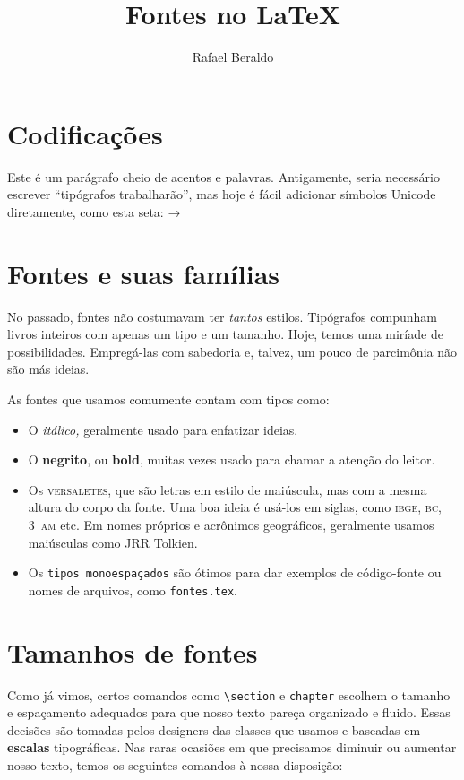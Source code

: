 \documentclass[11pt,a4paper,oneside]{article}
\title{Fontes no \LaTeX}
\author{Rafael Beraldo}
\begin{document}
\frenchspacing

\maketitle

\section{Codificações}

Este é um parágrafo cheio de acentos e palavras. Antigamente, seria necessário
escrever “tip\'{o}grafos trabalhar\~{a}o”, mas hoje é fácil adicionar símbolos
Unicode diretamente, como esta seta: →

\section{Fontes e suas famílias} 

No passado, fontes não costumavam ter \emph{tantos} estilos. Tipógrafos
compunham livros inteiros com apenas um tipo e um tamanho. Hoje, temos uma
miríade de possibilidades. Empregá-las com sabedoria e, talvez, um pouco de
parcimônia não são más ideias.

As fontes que usamos comumente contam com tipos como:

\begin{itemize}
  \item O \emph{itálico,} geralmente usado para enfatizar ideias.
  \item O \textbf{negrito}, ou \textbf{bold}, muitas vezes usado para chamar a
    atenção do leitor.
  \item Os \textsc{versaletes}, que são letras em estilo de maiúscula, mas com
    a mesma altura do corpo da fonte. Uma boa ideia é usá-los em siglas, como
    \textsc{ibge}, \textsc{bc}, 3~\textsc{am} etc. Em nomes próprios e
    acrônimos geográficos, geralmente usamos maiúsculas como JRR Tolkien.
  \item Os \texttt{tipos monoespaçados} são ótimos para dar exemplos de
    código-fonte ou nomes de arquivos, como \texttt{fontes.tex}.
\end{itemize}

\section{Tamanhos de fontes}

Como já vimos, certos comandos como \verb+\section+ e \verb+chapter+ escolhem o
tamanho e espaçamento adequados para que nosso texto pareça organizado e
fluido. Essas decisões são tomadas pelos designers das classes que usamos e
baseadas em \textbf{escalas} tipográficas. Nas raras ocasiões em que precisamos
\footnotesize diminuir \Large ou aumentar \normalsize nosso texto, temos os seguintes
comandos à nossa disposição:
\end{document}
